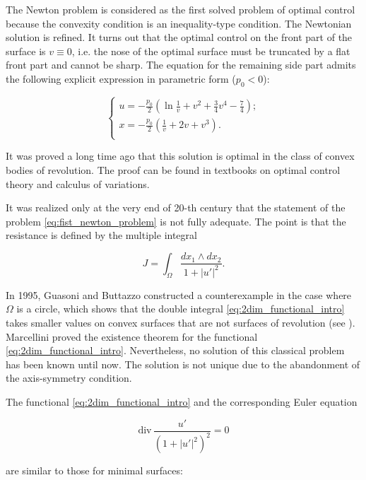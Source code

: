 \documentclass[14pt]{extarticle}
\theoremstyle{remark}
\theoremstyle{definition}
\begin{document}
The Newton problem is considered as the first solved problem of optimal control because the convexity condition is an inequality-type condition. The Newtonian solution is refined. It turns out that the optimal control on the front part of the surface is $v \equiv 0$, i.e. the nose of the optimal surface must be truncated by a flat front part and cannot be sharp. The equation for the remaining side part admits the following explicit expression in parametric form ($p_0<0$):

\[
	\begin{cases}
		u=-\frac{p_0}{2}\left( \ln \frac{1}{v}+v^2+\frac34 v^4-\frac74\right); \\
		x=-\frac{p_0}{2}\left(\frac{1}{v}+2v+v^3\right).\\
	\end{cases}
\]

\noindent It was proved a long time ago that this solution is optimal in the class of convex bodies of revolution. The proof can be found in textbooks on optimal control theory and calculus of variations.

It was realized only at the very end of 20-th century that the statement of the problem 
\eqref{eq:fist_newton_problem} is not fully adequate. The point is that the resistance is defined by the multiple integral

\begin{equation}
	\label{eq:2dim_functional_intro}
	J = \int_{\Omega}\frac {dx_1 \wedge dx_2}{1+|u'|^2}.
\end{equation}

\noindent In 1995, Guasoni and Buttazzo constructed a counterexample in the case where $\Omega$ is a circle, which shows that the double integral \eqref{eq:2dim_functional_intro} takes smaller values on convex surfaces that are not surfaces of revolution (see \cite{Guasoni}). Marcellini \cite{Marcellini1990} proved the existence theorem for the functional \eqref{eq:2dim_functional_intro}. Nevertheless, no solution of this classical problem has been known until now. The solution is not unique due to the abandonment of the axis-symmetry condition.

The functional \eqref{eq:2dim_functional_intro} and the corresponding Euler equation

\begin{equation}
	\label{eq:euler_lagrange_equation}
	\mathrm{div}\,\frac{u'}{(1+|u'|^2)^2} = 0
\end{equation}

\noindent are similar to those for minimal surfaces:
\end{document}
